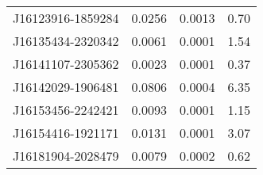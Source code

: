\begin{longtable}{lccc}
J16123916-1859284 &              0.0256 &                 0.0013 &           0.70 \\
J16135434-2320342 &              0.0061 &                 0.0001 &           1.54 \\
J16141107-2305362 &              0.0023 &                 0.0001 &           0.37 \\
J16142029-1906481 &              0.0806 &                 0.0004 &           6.35 \\
J16153456-2242421 &              0.0093 &                 0.0001 &           1.15 \\
J16154416-1921171 &              0.0131 &                 0.0001 &           3.07 \\
J16181904-2028479 &              0.0079 &                 0.0002 &           0.62 \\
\end{longtable}

